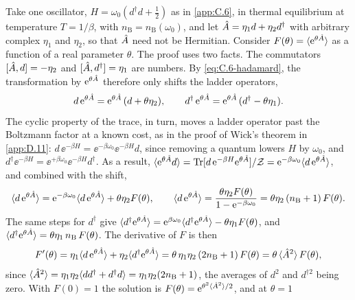 Take one oscillator, $H = \omega_0(d^\dagger d + \tfrac12)$ as in \cref{app:C.6}, in thermal equilibrium at temperature $T = 1/\beta$, with $n_{\mathrm{B}} = n_{\mathrm{B}}(\omega_0)$, and let $\hat{A} = \eta_1d + \eta_2d^\dagger$ with arbitrary complex $\eta_1$ and $\eta_2$, so that $\hat{A}$ need not be Hermitian. Consider $F(\theta) = \langle\mathrm{e}^{\theta\hat{A}}\rangle$ as a function of a real parameter $\theta$. The proof uses two facts. The commutators $[\hat{A}, d] = -\eta_2$ and $[\hat{A}, d^\dagger] = \eta_1$ are numbers. By \cref{eq:C.6-hadamard}, the transformation by $\mathrm{e}^{\theta\hat{A}}$ therefore only shifts the ladder operators,
\begin{equation*}
  d\,\mathrm{e}^{\theta\hat{A}} = \mathrm{e}^{\theta\hat{A}}\,(d + \theta\eta_2), \qquad d^\dagger\,\mathrm{e}^{\theta\hat{A}} = \mathrm{e}^{\theta\hat{A}}\,(d^\dagger - \theta\eta_1) .
\end{equation*}
The cyclic property of the trace, in turn, moves a ladder operator past the Boltzmann factor at a known cost, as in the proof of Wick's theorem in \cref{app:D.11}: $d\,\ee^{-\beta H} = \ee^{-\beta\omega_0}\ee^{-\beta H}d$, since removing a quantum lowers $H$ by $\omega_0$, and $d^\dagger\ee^{-\beta H} = \ee^{+\beta\omega_0}\ee^{-\beta H}d^\dagger$. As a result, $\langle\mathrm{e}^{\theta\hat{A}}d\rangle = \operatorname{Tr}[d\,\mathrm{e}^{-\beta H}\mathrm{e}^{\theta\hat{A}}]/\mathcal{Z} = \mathrm{e}^{-\beta\omega_0}\langle d\,\mathrm{e}^{\theta\hat{A}}\rangle$, and combined with the shift,
\begin{equation*}
  \langle d\,\mathrm{e}^{\theta\hat{A}}\rangle = \mathrm{e}^{-\beta\omega_0}\langle d\,\mathrm{e}^{\theta\hat{A}}\rangle + \theta\eta_2F(\theta), \qquad
  \langle d\,\mathrm{e}^{\theta\hat{A}}\rangle = \frac{\theta\eta_2F(\theta)}{1 - \mathrm{e}^{-\beta\omega_0}} = \theta\eta_2\,(n_{\mathrm{B}} + 1)\,F(\theta) .
\end{equation*}
The same steps for $d^\dagger$ give $\langle d^\dagger\mathrm{e}^{\theta\hat{A}}\rangle = \mathrm{e}^{\beta\omega_0}\langle d^\dagger\mathrm{e}^{\theta\hat{A}}\rangle - \theta\eta_1F(\theta)$, and $\langle d^\dagger\mathrm{e}^{\theta\hat{A}}\rangle = \theta\eta_1\,n_{\mathrm{B}}\,F(\theta)$. The derivative of $F$ is then
\begin{equation*}
  F'(\theta) = \eta_1\langle d\,\mathrm{e}^{\theta\hat{A}}\rangle + \eta_2\langle d^\dagger\mathrm{e}^{\theta\hat{A}}\rangle = \theta\,\eta_1\eta_2\,(2n_{\mathrm{B}} + 1)\,F(\theta) = \theta\,\langle\hat{A}^2\rangle\,F(\theta) ,
\end{equation*}
since $\langle\hat{A}^2\rangle = \eta_1\eta_2\langle dd^\dagger + d^\dagger d\rangle = \eta_1\eta_2(2n_{\mathrm{B}} + 1)$, the averages of $d^2$ and $d^{\dagger2}$ being zero. With $F(0) = 1$ the solution is $F(\theta) = \mathrm{e}^{\theta^2\langle\hat{A}^2\rangle/2}$, and at $\theta = 1$
